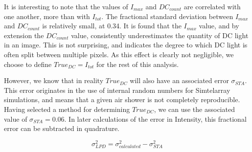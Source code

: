 \documentclass[11pt]{article}
\begin{document}
It is interesting to note that the values of $I_{max}$ and $DC_{count}$ are correlated with one another, more than with $I_{tot}$. The fractional standard deviation between $I_{max}$ and $DC_{count}$ is relatively small, at 0.34. It is found that the $I_{max}$ value, and by extension the $DC_{count}$ value, consistently underestimates the quantity of DC light in an image. This is not surprising, and indicates the degree to which DC light is often split between multiple pixels. As this effect is clearly not negligible, we choose to define $True_{DC}=I_{tot}$ for the rest of this analysis.

However, we know that in reality $True_{DC}$ will also have an associated error $\sigma_{STA}$. This error originates in the use of internal random numbers for Sim\textunderscore telarray simulations, and means that a given air shower is not completely reproducible. Having selected a method for determining $True_{DC}$, we can use the associated value of $\sigma_{STA}=0.06$. In later calculations of the error in Intensity, this fractional error can be subtracted in quadrature. 

\[ \sigma_{LPD}^{2} = \sigma_{calculated}^{2} - \sigma_{STA}^{2}  \]
\end{document}
